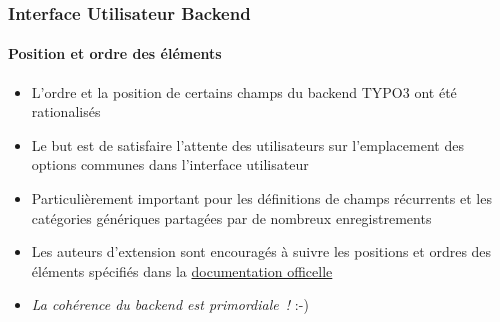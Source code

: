 \begin{frame}[fragile]
	\frametitle{Interface Utilisateur Backend}
	\framesubtitle{Position et ordre des éléments}

	\begin{itemize}
		\item L'ordre et la position de certains champs du backend TYPO3 ont été rationalisés
		\item Le but est de satisfaire l'attente des utilisateurs sur l'emplacement des
			options communes dans l'interface utilisateur
		\item Particulièrement important pour les définitions de champs récurrents et les
			catégories génériques partagées par de nombreux enregistrements
		\item Les auteurs d'extension sont encouragés à suivre les positions et ordres des éléments
			spécifiés dans la \href{https://docs.typo3.org}{documentation officelle}


	\end{itemize}

	\begin{itemize}
		\item \textit{La cohérence du backend est primordiale~!} :-)
	\end{itemize}

\end{frame}

